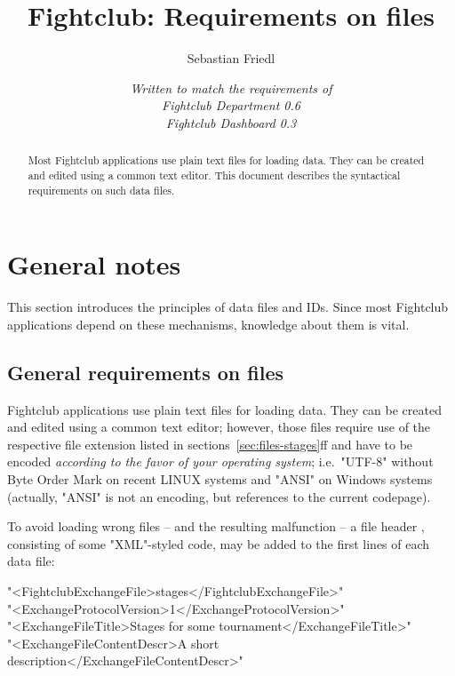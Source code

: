 \documentclass[11pt]{ltxdoc}
\title{\bfseries Fightclub: Requirements on files}
\author{Sebastian Friedl}
\date{\itshape Written to match the requirements of \\
      Fightclub Department 0.6 \\
      Fightclub Dashboard 0.3}
\def\highlight#1{%
    \colorbox{red!15}{#1}%
    \index{\textsf{#1}}}
\begin{document}
    \maketitle
    
    \begin{abstract}\noindent
        Most Fightclub applications use plain text files for loading data. They can be created and edited using a common text editor. This document describes the syntactical requirements on such data files.
    \end{abstract}

    \tableofcontents

    
    
    
    
    \clearpage
    \section{General notes}
    This section introduces the principles of data files and IDs.
    Since most Fightclub applications depend on these mechanisms, knowledge about them is vital.
    
    \subsection{General requirements on files}
    Fightclub applications use plain text files for loading data. They can be created and edited using a common text editor; however, those files require use of the respective file extension listed in sections~\ref{sec:files-stages}ff and have to be encoded \textit{according to the favor of your operating system}; i.e.~"UTF-8" without Byte Order Mark on recent LINUX systems and "ANSI" on Windows systems (actually, "ANSI" is not an encoding, but references to the current codepage).

    \medskip
    To avoid loading wrong files -- and the resulting malfunction -- a \highlight{file header}, consisting of some "XML"-styled code, may be added to the first lines of each data file:
    
    \smallskip
    "<FightclubExchangeFile>stages</FightclubExchangeFile>" \\
    "<ExchangeProtocolVersion>1</ExchangeProtocolVersion>" \\
    "<ExchangeFileTitle>Stages for some tournament</ExchangeFileTitle>" \\
    "<ExchangeFileContentDescr>A short description</ExchangeFileContentDescr>"
    
\end{document}

